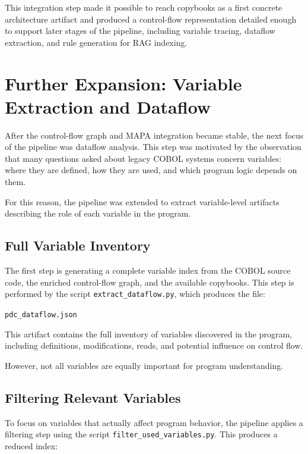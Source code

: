 \documentclass[11pt]{article}
\begin{document}
This integration step made it possible to reach copybooks as a first concrete architecture artifact and produced a control-flow representation detailed enough to support later stages of the pipeline, including variable tracing, dataflow extraction, and rule generation for RAG indexing.


\section{Further Expansion: Variable Extraction and Dataflow}
\label{sec:dataflow}

After the control-flow graph and MAPA integration became stable, the next focus of the pipeline was dataflow analysis. This step was motivated by the observation that many questions asked about legacy COBOL systems concern variables: where they are defined, how they are used, and which program logic depends on them.

For this reason, the pipeline was extended to extract variable-level artifacts describing the role of each variable in the program.

\subsection*{Full Variable Inventory}

The first step is generating a complete variable index from the COBOL source code, the enriched control-flow graph, and the available copybooks. This step is performed by the script \texttt{extract\_dataflow.py}, which produces the file:

\begin{center}
\texttt{pdc\_dataflow.json}
\end{center}

This artifact contains the full inventory of variables discovered in the program, including definitions, modifications, reads, and potential influence on control flow.

However, not all variables are equally important for program understanding.

\subsection*{Filtering Relevant Variables}

To focus on variables that actually affect program behavior, the pipeline applies a filtering step using the script \texttt{filter\_used\_variables.py}. This produces a reduced index:
\end{document}
